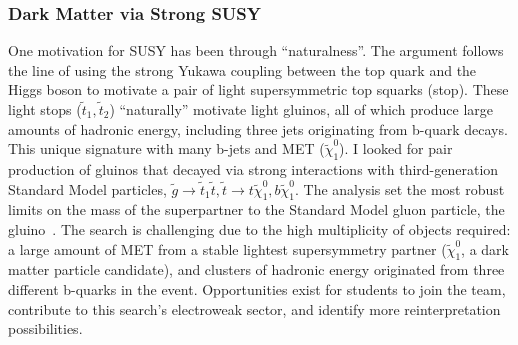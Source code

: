 \subsubsection{Dark Matter via Strong SUSY} \label{sssec:dark-matter-via-strong-susy}
One motivation for SUSY has been through \enquote{naturalness}. The argument follows the line of using the strong Yukawa coupling between the top quark and the Higgs boson to motivate a pair of light supersymmetric top squarks (stop). These light stops ($\tilde{t}_1, \tilde{t}_2$) \enquote{naturally} motivate light gluinos, all of which produce large amounts of hadronic energy, including three jets originating from b-quark decays. This unique signature with many b-jets and MET ($\tilde{\chi}_1^0$). I looked for pair production of gluinos that decayed via strong interactions with third-generation Standard Model particles, $\tilde{g} \to \tilde{t}_1 \tilde{t},  \tilde{t} \to t\tilde{\chi}_1^0, b\tilde{\chi}_1^0$. The analysis set the most robust limits on the mass of the superpartner to the Standard Model gluon particle, the gluino~. %
The search is challenging due to the high multiplicity of objects required: a large amount of MET from a stable lightest supersymmetry partner ($\tilde{\chi}_1^0$, a dark matter particle candidate), and clusters of hadronic energy originated from three different b-quarks in the event. Opportunities exist for students to join the team, contribute to this search's electroweak sector, and identify more reinterpretation possibilities.


